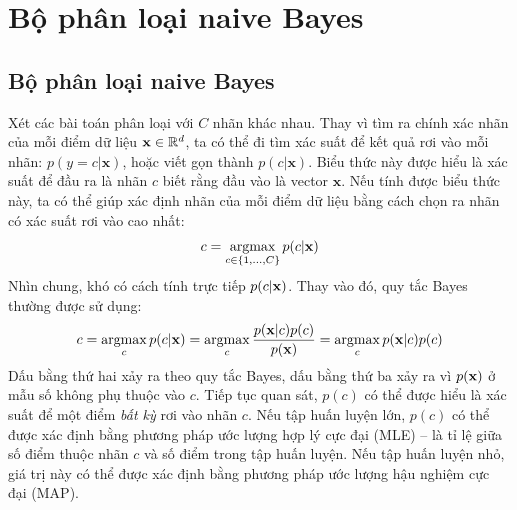 \chapter{Bộ phân loại naive Bayes}
\label{cha:nbc}

\section{Bộ phân loại naive Bayes}

Xét các bài toán phân loại với $C$ nhãn khác nhau. Thay vì tìm ra chính
xác nhãn của mỗi điểm dữ liệu $\mathbf{x} \in \mathbb{R}^d$, ta có thể đi tìm xác suất để kết quả rơi vào mỗi nhãn:
\begin{math}
\label{eqn:32_1}
p(y = c |\mathbf{x})
\end{math},
hoặc viết gọn thành $p(c|\mathbf{x})$. Biểu thức này được hiểu là xác suất để
đầu ra là nhãn $c$ biết rằng đầu vào là vector $\mathbf{x}$. Nếu tính được biểu thức này, ta có thể giúp xác định nhãn của mỗi điểm dữ liệu bằng cách chọn ra
nhãn có xác suất rơi vào cao nhất:
\begin{equation}
\label{eqn:32_2}
c = \operatorname*{argmax}_{c \in \{1, \dots, C\}} p(c | \mathbf{x})
\end{equation}
Nhìn chung, khó có cách tính trực tiếp $p(c|\mathbf{x})$. Thay vào đó,
quy tắc Bayes thường được sử dụng:
\begin{align}
c =  \operatorname*{argmax}_c p(c | \mathbf{x}) =
\operatorname*{argmax}_c \frac{p(\mathbf{x} | c) p(c)}{p(\mathbf{x})}
=  \operatorname*{argmax}_c p(\mathbf{x} | c) p(c)
\end{align}
Dấu bằng thứ hai xảy ra theo quy tắc Bayes, dấu bằng thứ ba xảy ra vì $p(\mathbf{x})$ ở
mẫu số không phụ thuộc vào $c$. Tiếp tục quan sát, $p(c)$ có thể được hiểu là
xác suất để một điểm \textit{bất kỳ} rơi vào nhãn $c$. Nếu tập huấn luyện lớn,
$p(c)$ có thể được xác định bằng phương pháp ước lượng hợp lý cực đại (MLE) -- là
tỉ lệ giữa số điểm thuộc nhãn $c$ và số điểm trong tập huấn luyện. Nếu tập huấn
luyện nhỏ, giá trị này có thể được xác định bằng phương pháp ước lượng hậu
nghiệm cực đại (MAP).

